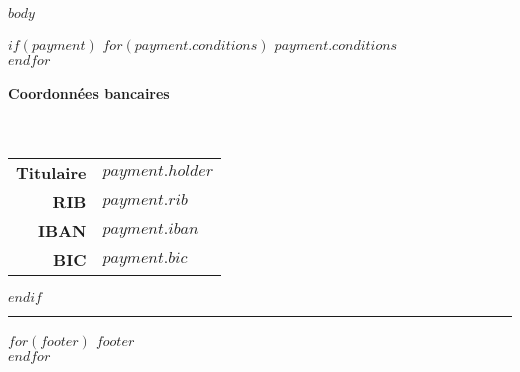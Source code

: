 \documentclass[$fontsize$, a4paper]{article}
\begin{document}
\vspace{10mm}

$body$

\vspace{5mm}

$if(payment)$
{
  \itshape
  $for(payment.conditions)$
  $payment.conditions$ \\
  $endfor$
}
\paragraph{Coordonnées bancaires} ~\\[5pt]

\sffamily
\begin{tabular}{rl}
  \textbf{Titulaire} & $payment.holder$ \\
  \textbf{RIB}       & $payment.rib$ \\
  \textbf{IBAN}      & $payment.iban$ \\
  \textbf{BIC}       & $payment.bic$ \\
\end{tabular}
$endif$


\vfill
\rule{\textwidth}{1pt}

\begin{minipage}{\textwidth}
  \footnotesize
  \itshape
  \sffamily
  \onehalfspacing
  \centering
  $for(footer)$
  $footer$ \\
  $endfor$
\end{minipage}
\end{document}
